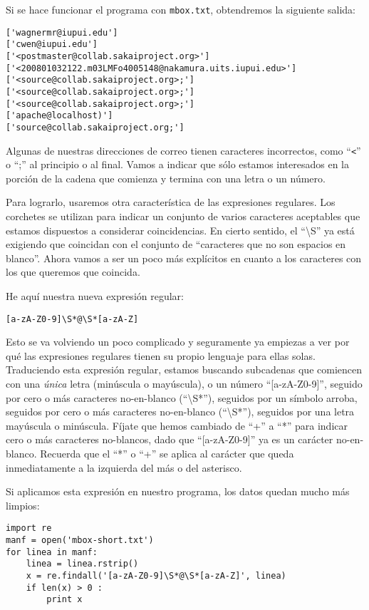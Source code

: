 Si se hace funcionar el programa con {\tt mbox.txt}, obtendremos la siguiente salida:

\beforeverb
\begin{verbatim}
['wagnermr@iupui.edu']
['cwen@iupui.edu']
['<postmaster@collab.sakaiproject.org>']
['<200801032122.m03LMFo4005148@nakamura.uits.iupui.edu>']
['<source@collab.sakaiproject.org>;']
['<source@collab.sakaiproject.org>;']
['<source@collab.sakaiproject.org>;']
['apache@localhost)']
['source@collab.sakaiproject.org;']
\end{verbatim}
\afterverb
%
Algunas de nuestras direcciones de correo tienen caracteres incorrectos, como  ``\verb"<"'' o ``;'' al principio
o al final. Vamos a indicar que sólo estamos interesados en la porción de la cadena que comienza y
termina con una letra o un número.

Para lograrlo, usaremos otra característica de las expresiones regulares. Los corchetes se utilizan para indicar
un conjunto de varios caracteres aceptables que estamos dispuestos a considerar coincidencias. En cierto sentido,
el ``{\textbackslash}S'' ya está exigiendo que coincidan con el conjunto de ``caracteres que no son espacios en
blanco''. Ahora vamos a ser un poco más explícitos en cuanto a los caracteres con los que queremos que coincida.

He aquí nuestra nueva expresión regular:

\beforeverb
\begin{verbatim}
[a-zA-Z0-9]\S*@\S*[a-zA-Z]
\end{verbatim}
\afterverb
%
Esto se va volviendo un poco complicado y seguramente ya empiezas a ver por qué las expresiones regulares tienen
su propio lenguaje para ellas solas. Traduciendo esta expresión regular, estamos buscando subcadenas que
comiencen con una {\em única} letra (minúscula o mayúscula), o un número ``[a-zA-Z0-9]'', seguido por cero
o más caracteres no-en-blanco (``{\textbackslash}S*''), seguidos por un símbolo arroba, seguidos por cero
o más caracteres no-en-blanco (``{\textbackslash}S*''), seguidos por una letra mayúscula o minúscula.
Fíjate que hemos cambiado de ``+'' a ``*'' para indicar cero o más caracteres no-blancos, dado que ``[a-zA-Z0-9]''
ya es un carácter no-en-blanco. Recuerda que el ``*'' o ``+'' se aplica al carácter que queda inmediatamente
a la izquierda del más o del asterisco.

Si aplicamos esta expresión en nuestro programa, los datos quedan mucho más limpios:

\beforeverb
\begin{verbatim}
import re
manf = open('mbox-short.txt')
for linea in manf:
    linea = linea.rstrip()
    x = re.findall('[a-zA-Z0-9]\S*@\S*[a-zA-Z]', linea)
    if len(x) > 0 :
        print x
\end{verbatim}
\afterverb
%

